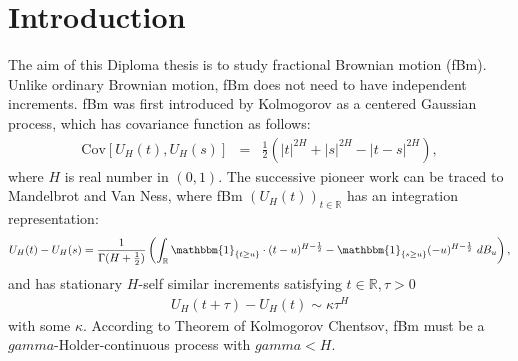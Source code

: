 \documentclass[a4paper, twoside, 11pt]{article}
\theoremstyle{definition}
\newcommand{\brkt}[1]{\left({#1} \right)}
\begin{document}
\section{Introduction}
The aim of this Diploma thesis is to study fractional Brownian motion (fBm). Unlike ordinary Brownian motion, fBm does not need to have independent increments. fBm was first introduced by Kolmogorov\cite{kolm} as a centered Gaussian process, which has covariance function as follows:
\begin{eqnarray*}
  \mathrm{Cov}[U_H(t), U_H(s)] &=& \frac{1}{2} (|t|^{2H} + |s|^{2H} - |t-s|^{2H}),
\end{eqnarray*}
where $H$ is real number in $(0, 1)$. The successive pioneer work can be traced to Mandelbrot and Van Ness\cite{mandelbrot}, where fBm $(U_H(t))_{t\in \mathbb{R}}$ has an integration representation:
\begin{eqnarray*}
 	U_H(t) - U_H(s) = \frac{1}{\Gamma(H+\frac{1}{2})}\brkt{\int_{\mathbb{R}} \mathbbm{1}_{\{t\ge u\}}\cdot (t-u)^{H-\frac{1}{2}} - \mathbbm{1}_{\{s\ge u\}} (-u)^{H-\frac{1}{2}} \, \mathop{dB_u}},
	\label{sec:int}
\end{eqnarray*}
and has stationary $H$-self similar increments satisfying  $t\in \mathbb{R}, \tau > 0$
\begin{eqnarray*}
  U_H(t+\tau) - U_H(t) \sim \kappa \tau^{H} 
  \label{sec:int1}
\end{eqnarray*}
with some $\kappa$. According to Theorem of Kolmogorov Chentsov, fBm must be a $gamma$-H\:older-continuous process with $gamma < H$.\\
\end{document}
